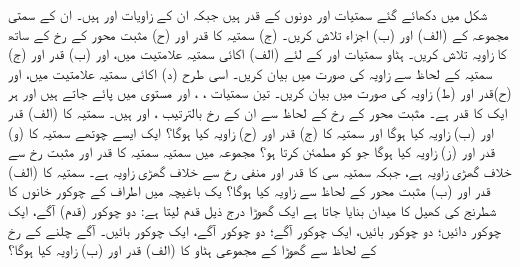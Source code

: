  شکل   میں دکھائے گئے سمتیات    اور   دونوں کے قدر  ہیں جبکہ ان کے زاویات    اور   ہیں۔ ان کے سمتی مجموعہ   کے  (الف)   اور  (ب)  اجزاء تلاش کریں۔  (ج) سمتیہ   کا قدر اور (ح) مثبت    محور کے رخ کے ساتھ    کا زاویہ تلاش کریں۔  
  ہٹاو سمتیات       اور         کے لئے  (الف) اکائی سمتیہ علامتیت میں، اور  (ب) قدر  اور  (ج) سمتیہ    کے لحاظ سے زاویہ کی صورت میں    بیان کریں۔ اسی طرح  (د) اکائی سمتیہ علامتیت میں، اور  (ح)قدر  اور  (ط) زاویہ کی صورت میں    بیان کریں۔  
تین سمتیات   ،   ، اور   مستوی   میں پائے جاتے ہیں اور ہر ایک کا قدر   ہے۔ مثبت   محور کے رخ کے لحاظ سے ان کے رخ بالترتیب   ،   اور   ہیں۔ سمتیہ   کا  (الف) قدر  اور  (ب) زاویہ  کیا ہوگا اور سمتیہ    کا  (ج) قدر  اور  (ح) زاویہ کیا ہوگا؟ ایک ایسے چوتھے سمتیہ    کا  (و) قدر  اور  (ز) زاویہ  کیا ہوگا جو   کو مطمئن کرتا ہو؟  
مجموعہ   میں سمتیہ سمتیہ   کا قدر    اور مثبت    رخ سے خلاف  گھڑی  زاویہ    ہے، جبکہ سمتیہ سی کا قدر    اور منفی   رخ سے خلاف  گھڑی زاویہ    ہے۔ سمتیہ   کا  (الف) قدر  اور  (ب) مثبت  محور کے لحاظ سے زاویہ کیا ہوگا؟  
 یک باغیچہ میں   اطراف کے چوکور خانوں کا شطرنج کی کھیل کا میدان بنایا جاتا ہے ایک گھوڑا درج ذیل قدم لیتا ہے:  دو چوکور  (قدم) آگے، ایک چوکور دائیں؛    دو چوکور بائیں، ایک چوکور آگے؛    دو چوکور آگے، ایک چوکور بائیں۔ آگے چلنے کے رخ کے لحاظ سے گھوڑا کے مجموعی ہٹاو کا  (الف) قدر  اور  (ب) زاویہ  کیا ہوگا؟  
